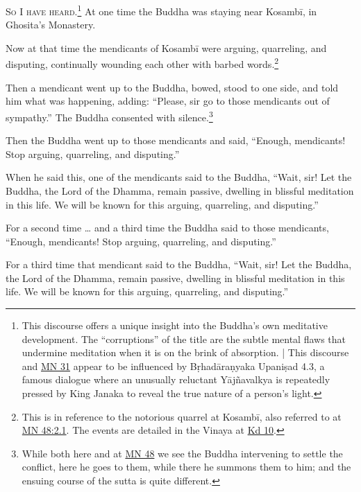 \documentclass[12pt,openany]{book}%
\newcommand*{\scevam}[1]{\textsc{#1}}
\begin{document}
\scevam{So I have heard.\footnote{This discourse offers a unique insight into the Buddha’s own meditative development. The “corruptions” of the title are the subtle mental flaws that undermine meditation when it is on the brink of absorption. | This discourse and \href{https://suttacentral.net/mn31/en/sujato}{MN 31} appear to be influenced by \textsanskrit{Bṛhadāraṇyaka} \textsanskrit{Upaniṣad} 4.3, a famous dialogue where an unusually reluctant \textsanskrit{Yājñavalkya} is repeatedly pressed by King Janaka to reveal the true nature of a person’s light. } }At one time the Buddha was staying near \textsanskrit{Kosambī}, in Ghosita’s Monastery. 

Now at that time the mendicants of \textsanskrit{Kosambī} were arguing, quarreling, and disputing, continually wounding each other with barbed words.\footnote{This is in reference to the notorious quarrel at \textsanskrit{Kosambī}, also referred to at \href{https://suttacentral.net/mn48/en/sujato\#2.1}{MN 48:2.1}. The events are detailed in the Vinaya at \href{https://suttacentral.net/pli-tv-kd10/en/sujato}{Kd 10}. } 

Then a mendicant went up to the Buddha, bowed, stood to one side, and told him what was happening, adding: “Please, sir go to those mendicants out of sympathy.” The Buddha consented with silence.\footnote{While both here and at \href{https://suttacentral.net/mn48/en/sujato}{MN 48} we see the Buddha intervening to settle the conflict, here he goes to them, while there he summons them to him; and the ensuing course of the sutta is quite different. } 

Then the Buddha went up to those mendicants and said, “Enough, mendicants! Stop arguing, quarreling, and disputing.” 

When he said this, one of the mendicants said to the Buddha, “Wait, sir! Let the Buddha, the Lord of the Dhamma, remain passive, dwelling in blissful meditation in this life. We will be known for this arguing, quarreling, and disputing.” 

For a second time … and a third time the Buddha said to those mendicants, “Enough, mendicants! Stop arguing, quarreling, and disputing.” 

For a third time that mendicant said to the Buddha, “Wait, sir! Let the Buddha, the Lord of the Dhamma, remain passive, dwelling in blissful meditation in this life. We will be known for this arguing, quarreling, and disputing.” 
\end{document}
